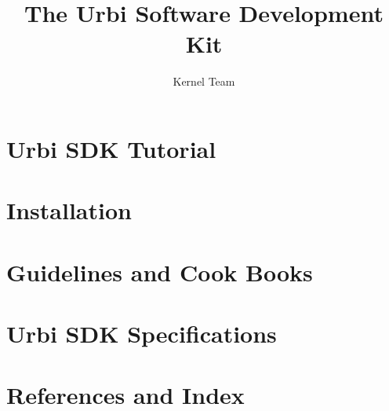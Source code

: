 \documentclass[openright,twoside,11pt]{book}
\title{The Urbi Software Development Kit}
\author{Kernel Team}
\begin{document}
\maketitle
\tableofcontents

\part{Urbi SDK Tutorial}



\part{Installation}


\part{Guidelines and Cook Books}



\part{Urbi SDK Specifications}


\part{References and Index}

\printindex
\end{document}
